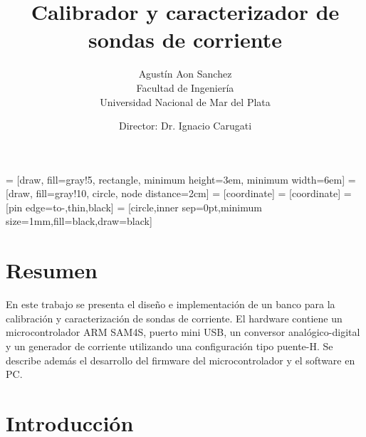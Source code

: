 \documentclass[titlepage, 12pt]{article}
\title{Calibrador y caracterizador de sondas de corriente}
\author{Agustín Aon Sanchez\\
Facultad de Ingeniería\\
Universidad Nacional de Mar del Plata}
\date{Director: Dr. Ignacio Carugati}
\begin{document}
\maketitle

\renewcommand{\baselinestretch}{1.25}\normalsize
\tableofcontents
\renewcommand{\baselinestretch}{1.0}\normalsize

\newpage

\usetikzlibrary{shapes, arrows, babel}
 = [draw, fill=gray!5, rectangle, minimum height=3em, minimum width=6em]
 = [draw, fill=gray!10, circle, node distance=2cm]
 = [coordinate]
 = [coordinate]
 = [pin edge={to-,thin,black}]
 = [circle,inner sep=0pt,minimum size=1mm,fill=black,draw=black]

\def\normalcoord(#1){coordinate(#1)}
\def\showcoord(#1){node[circle, red, draw, inner sep=1pt, pin={[red, overlay, inner sep=0.5pt, font=\tiny, pin distance=0.1cm, pin edge={red, overlay}]45:#1}](#1){}}
\let\coord=\normalcoord

\renewcommand{\listtablename}{Índice de tablas}
\renewcommand{\tablename}{Tabla}


\section{Resumen}
En este trabajo se presenta el diseño e implementación de un banco para la calibración y caracterización de sondas de corriente. El hardware contiene un microcontrolador ARM SAM4S, puerto mini USB, un conversor analógico-digital y un generador de corriente utilizando una configuración tipo puente-H. Se describe además el desarrollo del firmware del microcontrolador y el software en PC.

\section{Introducción}

\end{document}
